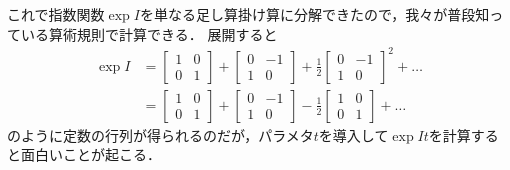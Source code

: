\documentclass{jsbook}
\begin{document}
これで指数関数$\exp I$を単なる足し算掛け算に分解できたので，我々が普段知っている算術規則で計算できる．
展開すると
\begin{align}
\exp I&=\begin{bmatrix}1&0\\0&1\end{bmatrix}+\begin{bmatrix}0&-1\\1&0\end{bmatrix}+\frac{1}{2}\begin{bmatrix}0&-1\\1&0\end{bmatrix}^2+\dots\\
&=\begin{bmatrix}1&0\\0&1\end{bmatrix}+\begin{bmatrix}0&-1\\1&0\end{bmatrix}-\frac{1}{2}\begin{bmatrix}1&0\\0&1\end{bmatrix}+\dots
\end{align}
のように定数の行列が得られるのだが，パラメタ$t$を導入して$\exp It$を計算すると面白いことが起こる．
\end{document}
